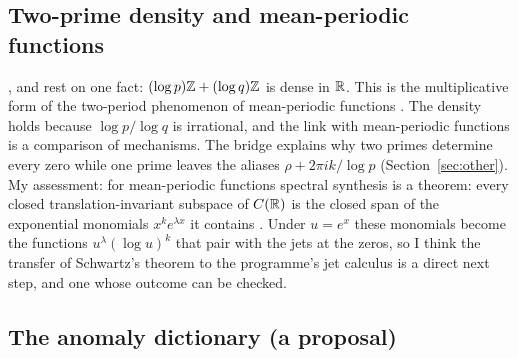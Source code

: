 \subsection{Two-prime density and mean-periodic functions}

,  and  rest on one fact: $(\log p)\mathbb{Z}+(\log q)\mathbb{Z}$ is dense in $\mathbb{R}$. This is the multiplicative form of the two-period phenomenon of mean-periodic functions \cite{SchwartzMP}. The density holds because $\log p/\log q$ is irrational, and the link with mean-periodic functions is a comparison of mechanisms.
The bridge explains why two primes determine every zero while one prime leaves the aliases $\rho+2\pi ik/\log p$ (Section~\ref{sec:other}).
My assessment: for mean-periodic functions spectral synthesis is a theorem: every closed translation-invariant subspace of $C(\mathbb{R})$ is the closed span of the exponential monomials $x^ke^{\lambda x}$ it contains \cite{SchwartzMP}. Under $u=e^x$ these monomials become the functions $u^{\lambda}(\log u)^k$ that pair with the jets at the zeros, so I think the transfer of Schwartz's theorem to the programme's jet calculus is a direct next step, and one whose outcome can be checked.

\subsection{The anomaly dictionary (a proposal)}

